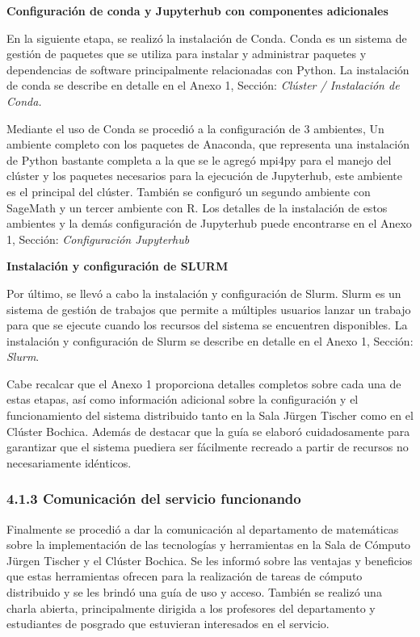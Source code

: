 \begin{spacing}{1.5}
\textbf{Configuración de conda y Jupyterhub con componentes adicionales}

En la siguiente etapa, se realizó la instalación de Conda. Conda es un sistema de gestión de paquetes que se utiliza para instalar y administrar paquetes y dependencias de software principalmente relacionadas con Python. La instalación de conda se describe en detalle en el Anexo 1, Sección: \textit{Clúster / Instalación de Conda.}

Mediante el uso de Conda se procedió a la configuración de 3 ambientes, Un ambiente completo con los paquetes de Anaconda, que representa una instalación de Python bastante completa a la que se le agregó mpi4py para el manejo del clúster y los paquetes necesarios para la ejecución de Jupyterhub, este ambiente es el principal del clúster. También se configuró un segundo ambiente con SageMath y un tercer ambiente con R. Los detalles de la instalación de estos ambientes y la demás configuración de Jupyterhub puede encontrarse en el Anexo 1, Sección: \textit{Configuración Jupyterhub}

\textbf{Instalación y configuración de SLURM}

Por último, se llevó a cabo la instalación y configuración de Slurm. Slurm es un sistema de gestión de trabajos que permite a múltiples usuarios lanzar un trabajo para que se ejecute cuando los recursos del sistema se encuentren disponibles. La instalación y configuración de Slurm se describe en detalle en el Anexo 1, Sección: \textit{Slurm}.

Cabe recalcar que el Anexo 1 proporciona detalles completos sobre cada una de estas etapas, así como información adicional sobre la configuración y el funcionamiento del sistema distribuido tanto en la Sala Jürgen Tischer como en el Clúster Bochica. Además de destacar que la guía se elaboró cuidadosamente para garantizar que el sistema puediera ser fácilmente recreado a partir de recursos no necesariamente idénticos.

\subsubsection{4.1.3 Comunicación del servicio funcionando}

Finalmente se procedió a dar la comunicación al departamento de matemáticas sobre la implementación de las tecnologías y herramientas en la Sala de Cómputo Jürgen Tischer y el Clúster Bochica. Se les informó sobre las ventajas y beneficios que estas herramientas ofrecen para la realización de tareas de cómputo distribuido y se les brindó una guía de uso y acceso. También se realizó una charla abierta, principalmente dirigida a los profesores del departamento y estudiantes de posgrado que estuvieran interesados en el servicio.


\end{spacing}
